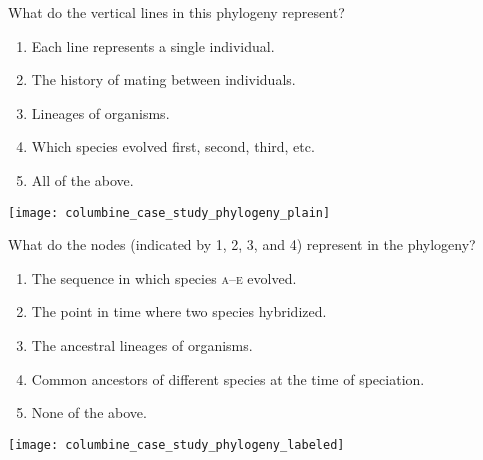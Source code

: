 \documentclass[t,handout]{beamer}  %
\newcommand{\ques}[1]{\highlight{\textsc{q#1:}}}
\begin{document}
%
\begin{frame}[t]{\ques2 What do the vertical lines in this phylogeny represent?}

	\begin{multicols}{2}
	\begin{enumerate}

		\item Each line represents a single individual.

		\item The history of mating between individuals.

		\item \alert<2>{Lineages of organisms.}

		\item Which species evolved first, second, third, etc.

		\item All of the above. 

	\end{enumerate}

	\columnbreak
	
	\hfill \texttt{[image: columbine\_case\_study\_phylogeny\_plain]}
	\end{multicols}
\end{frame}
%
\begin{frame}[t]{\ques3 What do the nodes (indicated by 1, 2, 3, and 4) represent in the phylogeny?}

	\begin{multicols}{2}
	\begin{enumerate}

		\item The sequence in which species \textsc{a}–\textsc{e} evolved.
		
		\item The point in time where two species hybridized.
		
		\item The ancestral lineages of organisms.
		
		\item \alert<2>{Common ancestors of different species at the time of speciation.}
		
		\item None of the above.

	\end{enumerate}

	\columnbreak
	
	\hfill \texttt{[image: columbine\_case\_study\_phylogeny\_labeled]}
		
	\end{multicols}
\end{frame}
\end{document}
